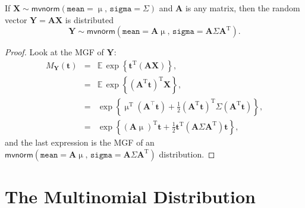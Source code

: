 \documentclass[captions=tableheading]{scrbook}
\begin{document}
\begin{thm}
If \(\mathbf{X}\sim\mathsf{mvnorm}(\mathtt{mean}=\upmu,\,\mathtt{sigma}=\Sigma)\) and \(\mathbf{A}\) is any matrix, then the random vector \(\mathbf{Y}=\mathbf{AX}\)
is distributed
\begin{equation}
\mathbf{Y}\sim\mathsf{mvnorm}(\mathtt{mean}=\mathbf{A}\upmu,\,\mathtt{sigma}=\mathbf{A}\Sigma\mathbf{A}^{\mathrm{T}}).
\end{equation}
\end{thm}

\begin{proof}
Look at the MGF of \(\mathbf{Y}\):
\begin{eqnarray*}
M_{\mathbf{Y}}(\mathbf{t}) & = & \mathbb{E}\,\exp\left\{ \mathbf{t}^{\mathrm{T}}(\mathbf{AX})\right\} ,\\
 & = & \mathbb{E}\,\exp\left\{ (\mathbf{A}^{\mathrm{T}}\mathbf{t})^{\mathrm{T}}\mathbf{X}\right\} ,\\
 & = & \exp\left\{ \upmu^{\mathrm{T}}(\mathbf{A}^{\top}\mathbf{t})+\frac{1}{2}(\mathbf{A}^{\mathrm{T}}\mathbf{t})^{\mathrm{T}}\Sigma(\mathbf{A}^{\mathrm{T}}\mathbf{t})\right\} ,\\
 & = & \exp\left\{ \left(\mathbf{A}\upmu\right)^{\mathrm{T}}\mathbf{t}+\frac{1}{2}\mathbf{t}^{\mathrm{T}}\left(\mathbf{A}\Sigma\mathbf{A}^{\mathrm{T}}\right)\mathbf{t}\right\},
\end{eqnarray*}
and the last expression is the MGF of an \(\mathsf{mvnorm}(\mathtt{mean}=\mathbf{A}\upmu,\,\mathtt{sigma}=\mathbf{A}\Sigma\mathbf{A}^{\mathrm{T}})\) distribution.
\end{proof}
\section{The Multinomial Distribution}
\label{sec-7-9}
\label{sec-Multinomial}
\end{document}
